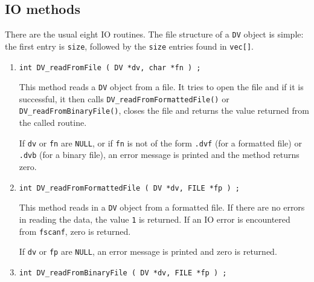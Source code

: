 \subsection{IO methods}
\label{subsection:DV:proto:IO}
\par
There are the usual eight IO routines.
The file structure of a {\tt DV} object is simple:
the first entry is {\tt size}, followed by the {\tt size} entries
found in {\tt vec[]}.
\par
\begin{enumerate}
\item
\begin{verbatim}
int DV_readFromFile ( DV *dv, char *fn ) ;
\end{verbatim}
\par
This method reads a {\tt DV} object from a file.
It tries to open the file and if it is successful, 
it then calls {\tt DV\_readFromFormattedFile()} or
{\tt DV\_readFromBinaryFile()}, 
closes the file
and returns the value returned from the called routine.
\par {}
If {\tt dv} or {\tt fn} are {\tt NULL}, 
or if {\tt fn} is not of the form
{\tt *.dvf} (for a formatted file) 
or {\tt *.dvb} (for a binary file),
an error message is printed and the method returns zero.
\item
\begin{verbatim}
int DV_readFromFormattedFile ( DV *dv, FILE *fp ) ;
\end{verbatim}
\par
This method reads in a {\tt DV} object from a formatted file.
If there are no errors in reading the data, 
the value {\tt 1} is returned.
If an IO error is encountered from {\tt fscanf}, zero is returned.
\par {}
If {\tt dv} or {\tt fp} are {\tt NULL},
an error message is printed and zero is returned.
\item
\begin{verbatim}
int DV_readFromBinaryFile ( DV *dv, FILE *fp ) ;
\end{verbatim}

\end{enumerate}
